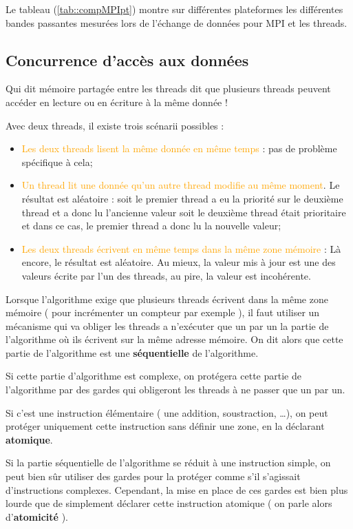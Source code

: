 \documentclass[fleqn,11pt]{article}
\begin{document}
Le tableau (\ref{tab::compMPIpt}) 
montre sur différentes plateformes les différentes bandes passantes mesurées lors de l'échange de données pour MPI et les threads.

\subsection{Concurrence d'accès aux données}

Qui dit mémoire partagée entre les threads dit que plusieurs threads peuvent accéder
en lecture ou en écriture à la même donnée !

Avec deux threads, il existe trois scénarii possibles :
\begin{itemize}
\item \textcolor{orange}{Les deux threads lisent la même donnée en même temps} : pas de problème spécifique
à cela;
\item \textcolor{orange}{Un thread lit une donnée qu'un autre thread modifie au même moment}.  Le résultat est aléatoire :
soit le premier thread a eu la priorité sur le deuxième thread et a donc lu l'ancienne valeur soit
le deuxième thread était prioritaire et dans ce cas, le premier thread a donc lu la nouvelle valeur;
\item \textcolor{orange}{Les deux threads écrivent en même temps dans la même zone mémoire} : Là encore, le résultat
est aléatoire. Au mieux, la valeur mis à jour est une des valeurs écrite par l'un des threads, au pire, la valeur
est incohérente.
\end{itemize}

Lorsque l'algorithme exige que plusieurs threads écrivent dans la même zone mémoire ( pour incrémenter un
compteur par exemple ), il faut utiliser un mécanisme qui va obliger les threads a n'exécuter que un par un
la partie de l'algorithme où ils écrivent sur la même adresse mémoire. On dit alors que cette partie de l'algorithme
est une \textbf{séquentielle} de l'algorithme.

Si cette partie d'algorithme est complexe, on protégera cette partie de l'algorithme par des gardes qui obligeront
les threads à ne passer que un par un.

Si c'est une instruction élémentaire ( une addition, soustraction, \ldots ), on peut protéger uniquement cette instruction
sans définir une zone, en la déclarant \textbf{atomique}.

Si la partie séquentielle de l'algorithme se réduit à une instruction simple, on peut bien sûr utiliser des gardes pour
la protéger comme s'il s'agissait d'instructions complexes. Cependant, la mise en place de ces gardes est bien plus lourde
que de simplement déclarer cette instruction atomique ( on parle alors d'\textbf{atomicité} ).
\end{document}
